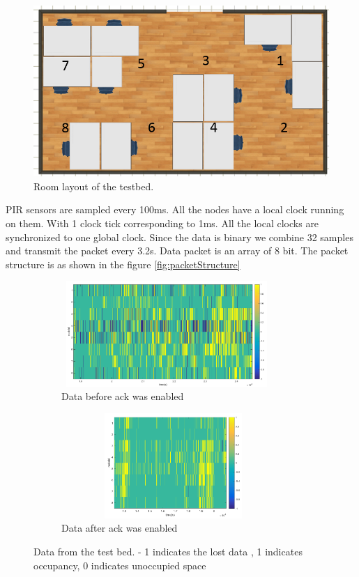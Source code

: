 \begin{figure}[!ht]
\centering
\includegraphics[scale=0.5]{./pics/roomLayout.png}
\caption{Room layout of the testbed.}
\label{fig:roomLayout}
\end{figure}

PIR sensors are sampled every 100ms. All the nodes have a local clock running on them. With 1 clock tick corresponding to 1ms. All the local clocks are synchronized to one global clock. Since the data is binary we combine 32 samples and transmit the packet every 3.2s. 
Data packet is an array of 8 bit. The packet structure is as shown in the figure \ref{fig:packetStructure}\\


\begin{figure}[!ht]
    \centering
    \begin{subfigure}[b]{1\textwidth}
        \centering
        \includegraphics[width=8cm,height=4cm]{./pics/packetLoss.png}
      \caption{Data before ack was enabled}
    \end{subfigure}
    \hfill
    \begin{subfigure}[b]{1\textwidth}
        \centering
        \includegraphics[width=8.5cm,height=4cm]{./pics/dataAfterAck.png}
        \caption{Data after ack was enabled}
    \end{subfigure}
\caption{Data from the test bed. - 1 indicates the lost data , 1 indicates occupancy, 0 indicates unoccupied space}
\label{fig:packetLoss}
\end{figure}

